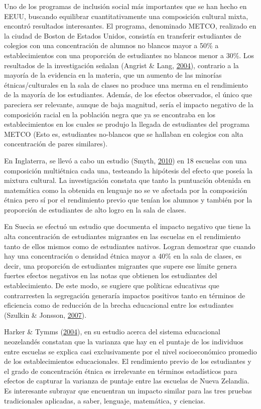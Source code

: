 \documentclass[
]{article}
\begin{document}
Uno de los programas de inclusión social más importantes que se han
hecho en EEUU, buscando equilibrar cuantitativamente una composición
cultural mixta, encontró resultados interesantes. El programa,
denominado METCO, realizado en la ciudad de Boston de Estados Unidos,
consistía en transferir estudiantes de colegios con una concentración de
alumnos no blancos mayor a 50\% a establecimientos con una proporción de
estudiantes no blancos menor a 30\%. Los resultados de la investigación
señalan (Angrist \& Lang,
\protect\hyperlink{ref-angrist_does_2004}{2004}), contrario a la mayoría
de la evidencia en la materia, que un aumento de las minorías
étnicas/culturales en la sala de clases no produce una merma en el
rendimiento de la mayoría de los estudiantes. Además, de los efectos
observados, el único que pareciera ser relevante, aunque de baja
magnitud, sería el impacto negativo de la composición racial en la
población negra que ya se encontraba en los establecimientos en los
cuales se produjo la llegada de estudiantes del programa METCO (Esto es,
estudiantes no-blancos que se hallaban en colegios con alta
concentración de pares similares).

En Inglaterra, se llevó a cabo un estudio (Smyth,
\protect\hyperlink{ref-smyth_singlesex_2010}{2010}) en 18 escuelas con
una composición multiétnica cada una, testeando la hipótesis del efecto
que poseía la mixtura cultural. La investigación constata que tanto la
puntuación obtenida en matemática como la obtenida en lenguaje no se ve
afectada por la composición étnica pero sí por el rendimiento previo que
tenían los alumnos y también por la proporción de estudiantes de alto
logro en la sala de clases.

En Suecia se efectuó un estudio que documenta el impacto negativo que
tiene la alta concentración de estudiantes migrantes en las escuelas en
el rendimiento tanto de ellos mismos como de estudiantes nativos. Logran
demostrar que cuando hay una concentración o densidad étnica mayor a
40\% en la sala de clases, es decir, una proporción de estudiantes
migrantes que supere ese límite genera fuertes efectos negativos en las
notas que obtienen los estudiantes del establecimiento. De este modo, se
sugiere que políticas educativas que contrarresten la segregación
generaría impactos positivos tanto en términos de eficiencia como de
reducción de la brecha educacional entre los estudiantes (Szulkin \&
Jonsson, \protect\hyperlink{ref-szulkin_ethnic_2007}{2007}).

Harker \& Tymms (\protect\hyperlink{ref-harker_effects_2004}{2004}), en
su estudio acerca del sistema educacional neozelandés constatan que la
varianza que hay en el puntaje de los individuos entre escuelas se
explica casi exclusivamente por el nivel socioeconómico promedio de los
establecimientos educacionales. El rendimiento previo de los estudiantes
y el grado de concentración étnica es irrelevante en términos
estadísticos para efectos de capturar la varianza de puntaje entre las
escuelas de Nueva Zelandia. Es interesante subrayar que encuentran un
impacto similar para las tres pruebas tradicionales aplicadas, a saber,
lenguaje, matemática, y ciencias.
\end{document}
